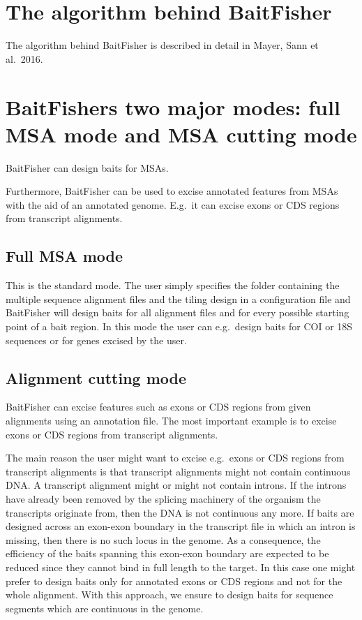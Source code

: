 \documentclass[a4paper,pdflatex,11pt]{article}
\begin{document}
\section{The algorithm behind BaitFisher}

The algorithm behind BaitFisher is described in detail in 
Mayer, Sann et al.\ 2016.


\section{BaitFishers two major modes: full MSA mode and MSA cutting mode}

BaitFisher can design baits for MSAs. 

Furthermore, BaitFisher can be used to excise annotated features from MSAs with the aid of
an annotated genome. E.g.\ it can excise exons or CDS regions from transcript alignments.

\subsection{Full MSA mode}

This is the standard mode. The user simply specifies the folder containing the multiple sequence alignment files
and the tiling design in a configuration file and BaitFisher will design baits for all alignment files and for every
possible starting point of a bait region.
In this mode the user can e.g.\ design baits for COI or 18S sequences or for genes excised by the user.

\subsection{Alignment cutting mode} \label{section_alignment_cutting}

BaitFisher can excise features such as exons or CDS regions from given alignments using an annotation file.
The most important example is to excise exons or CDS regions from transcript alignments.

The main reason the user might want to excise e.g.\ exons or CDS regions from transcript alignments is that
transcript alignments might not contain continuous DNA. A transcript alignment might or might not contain
introns. If the introns have already been removed by the splicing machinery of the organism the transcripts originate from,
then the DNA is not continuous any more. If baits are designed across an exon-exon boundary in the transcript file in which
an intron is missing, then there is no such locus in the genome. As a consequence, the efficiency of the baits
spanning this exon-exon boundary are expected to be reduced since they cannot bind in full length to the target.
In this case one might prefer to design baits only for
annotated exons or CDS regions and not for the whole alignment.
With this approach, we ensure to design baits for sequence segments which are continuous in the genome.
\end{document}

